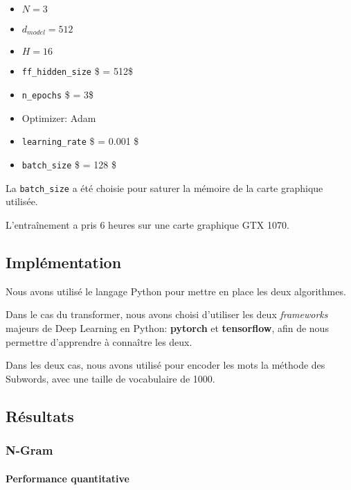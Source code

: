 \begin{itemize}
\tightlist
\item
  \(N = 3\)
\item
  \(d_{model} = 512\)
\item
  \(H = 16\)
\item
  \texttt{ff\_hidden\_size} \$ = 512\$
\item
  \texttt{n\_epochs} \$ = 3\$
\item
  Optimizer: Adam
\item
  \texttt{learning\_rate} \$ = 0.001 \$
\item
  \texttt{batch\_size} \$ = 128 \$
\end{itemize}

La \texttt{batch\_size} a été choisie pour saturer la mémoire de la
carte graphique utilisée.

L'entraînement a pris 6 heures sur une carte graphique GTX 1070.

\hypertarget{impluxe9mentation}{%
\subsection{Implémentation}\label{impluxe9mentation}}

Nous avons utilisé le langage Python pour mettre en place les deux
algorithmes.

Dans le cas du transformer, nous avons choisi d'utiliser les deux
\emph{frameworks} majeurs de Deep Learning en Python: \textbf{pytorch}
et \textbf{tensorflow}, afin de nous permettre d'apprendre à connaître
les deux.

Dans les deux cas, nous avons utilisé pour encoder les mots la méthode
des Subwords, avec une taille de vocabulaire de 1000.

\hypertarget{ruxe9sultats}{%
\subsection{Résultats}\label{ruxe9sultats}}

\hypertarget{n-gram}{%
\subsubsection{N-Gram}\label{n-gram}}

\hypertarget{performance-quantitative}{%
\paragraph{Performance quantitative}\label{performance-quantitative}}

